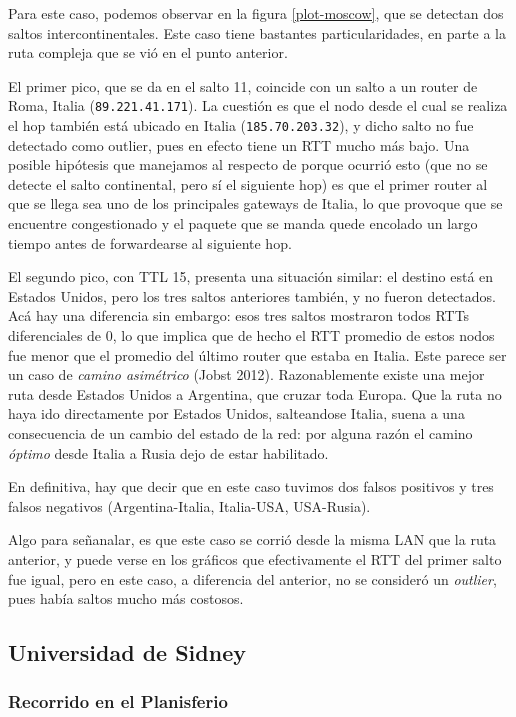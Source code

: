 Para este caso, podemos observar en la figura \ref{plot-moscow}, que se detectan dos saltos intercontinentales. Este caso tiene bastantes particularidades, en parte a la ruta compleja que se vió en el punto anterior. 

El primer pico, que se da en el salto 11, coincide con un salto a un router de Roma, Italia (\texttt{89.221.41.171}). La cuestión es que el nodo desde el cual se realiza el hop también está ubicado en Italia (\texttt{185.70.203.32}), y dicho salto no fue detectado como outlier, pues en efecto tiene un RTT mucho más bajo. Una posible hipótesis que manejamos al respecto de porque ocurrió esto (que no se detecte el salto continental, pero sí el siguiente hop) es que el primer router al que se llega sea uno de los principales gateways de Italia, lo que provoque que se encuentre congestionado y el paquete que se manda quede encolado un largo tiempo antes de forwardearse al siguiente hop. 

El segundo pico, con TTL 15, presenta una situación similar: el destino está en Estados Unidos, pero los tres saltos anteriores también, y no fueron detectados. Acá hay una diferencia sin embargo: esos tres saltos mostraron todos RTTs diferenciales de 0, lo que implica que de hecho el RTT promedio de estos nodos fue menor que el promedio del último router que estaba en Italia. Este parece ser un caso de \textit{camino asimétrico} (Jobst 2012). Razonablemente existe una mejor ruta desde Estados Unidos a Argentina, que cruzar toda Europa. Que la ruta no haya ido directamente por Estados Unidos, salteandose Italia, suena a una consecuencia de un cambio del estado de la red: por alguna razón el camino \textit{óptimo} desde Italia a Rusia dejo de estar habilitado.

En definitiva, hay que decir que en este caso tuvimos dos falsos positivos y tres falsos negativos (Argentina-Italia, Italia-USA, USA-Rusia). 

Algo para señanalar, es que este caso se corrió desde la misma LAN que la ruta anterior, y puede verse en los gráficos que efectivamente el RTT del primer salto fue igual, pero en este caso, a diferencia del anterior, no se consideró un \emph{outlier}, pues había saltos mucho más costosos.

\subsection*{Universidad de Sidney}

\subsubsection*{Recorrido en el Planisferio}


